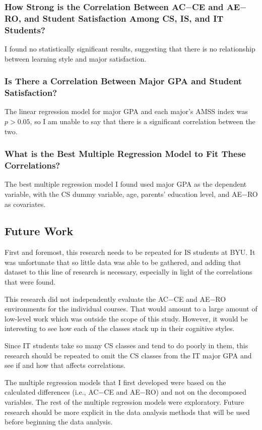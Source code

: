 \subsubsection{How Strong is the Correlation Between AC$-$CE and AE$-$RO, and Student Satisfaction Among CS, IS, and IT Students?}
I found no statistically significant results, suggesting that there is no relationship between learning style and major satisfaction.

\subsubsection{Is There a Correlation Between Major GPA and Student Satisfaction?}
The linear regression model for major GPA and each major's AMSS index was $p>0.05$, so I am unable to say that there is a significant correlation between the two.

\subsubsection{What is the Best Multiple Regression Model to Fit These Correlations?}
The best multiple regression model I found used major GPA as the dependent variable, with the CS dummy variable, age, parents' education level, and AE$-$RO as covariates.

\subsection{Future Work}
First and foremost, this research needs to be repeated for IS students at BYU. It was unfortunate that so little data was able to be gathered, and adding that dataset to this line of research is necessary, especially in light of the correlations that were found.

This research did not independently evaluate the AC$-$CE and AE$-$RO environments for the individual courses. That would amount to a large amount of low-level work which was outside the scope of this study. However, it would be interesting to see how each of the classes stack up in their cognitive styles.

Since IT students take so many CS classes and tend to do poorly in them, this research should be repeated to omit the CS classes from the IT major GPA and see if and how that affects correlations.

The multiple regression models that I first developed were based on the calculated differences (i.e., AC$-$CE and AE$-$RO) and not on the decomposed variables. The rest of the multiple regression models were exploratory. Future research should be more explicit in the data analysis methods that will be used before beginning the data analysis.

